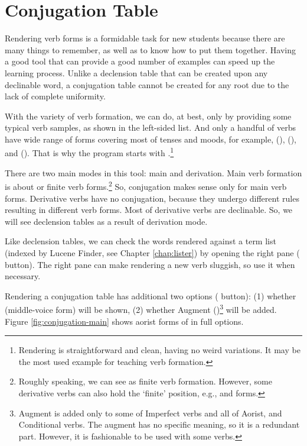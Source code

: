 \chapter{Conjugation Table}

Rendering verb forms is a formidable task for new students because there are many things to remember, as well as to know how to put them together. Having a good tool that can provide a good number of examples can speed up the learning process. Unlike a declension table that can be created upon any declinable word, a conjugation table cannot be created for any root due to the lack of complete uniformity.

With the variety of verb formation, we can do, at best, only by providing some typical verb samples, as shown in the left-sided list. And only a handful of verbs have wide range of forms covering most of tenses and moods, for example,  (),  (), and  (). That is why the program starts with .\footnote{Rendering  is straightforward and clean, having no weird variations. It may be the most used example for teaching verb formation.}

There are two main modes in this tool: main and derivation. Main verb formation is about  or finite verb forms.\footnote{Roughly speaking, we can see  as finite verb formation. However, some derivative verbs can also hold the `finite' position, e.g.,  and  forms.} So, conjugation makes sense only for main verb forms. Derivative verbs have no conjugation, because they undergo different rules resulting in different verb forms. Most of derivative verbs are declinable. So, we will see declension tables as a result of derivation mode.

Like declension tables, we can check the words rendered against a term list (indexed by Lucene Finder, see Chapter \ref{chap:lister}) by opening the right pane ({\faSix {}} button). The right pane can make rendering a new verb sluggish, so use it when necessary.

Rendering a conjugation table has additional two options ({\faSix {}} button): (1) whether  (middle-voice form) will be shown, (2) whether Augment ()\footnote{Augment is added only to some of Imperfect verbs and all of Aorist, and Conditional verbs. The augment has no specific meaning, so it is a redundant part. However, it is fashionable to be used with some verbs.} will be added. Figure \ref{fig:conjugation-main} shows aorist forms of  in full options.

